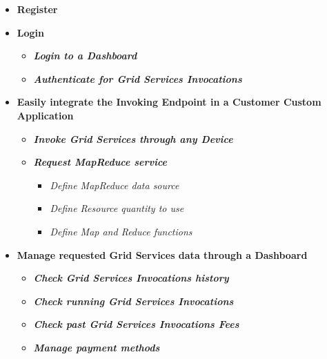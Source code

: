 \begin{itemize}
    \item \textbf{Register}\\
    \item \textbf{Login}\\
    \begin{itemize}
        \item \textbf{\textit{Login to a Dashboard}}\\
        \item \textbf{\textit{Authenticate for Grid Services Invocations}}\\
    \end{itemize}
    \item \textbf{Easily integrate the Invoking Endpoint in a Customer Custom Application}\\
    \begin{itemize}
        \item \textbf{\textit{Invoke Grid Services through any Device}}\\
        \item \textbf{\textit{Request MapReduce service}}\\
        \begin{itemize}
            \item \textit{Define MapReduce data source}\\
            \item \textit{Define Resource quantity to use}\\
            \item \textit{Define Map and Reduce functions}\\
        \end{itemize}
    \end{itemize}
    \item \textbf{Manage requested Grid Services data through a Dashboard}\\
    \begin{itemize}
        \item \textbf{\textit{Check Grid Services Invocations history}}\\
        \item \textbf{\textit{Check running Grid Services Invocations}}\\
        \item \textbf{\textit{Check past Grid Services Invocations Fees}}\\
        \item \textbf{\textit{Manage payment methods}}\\
    \end{itemize}
\end{itemize}